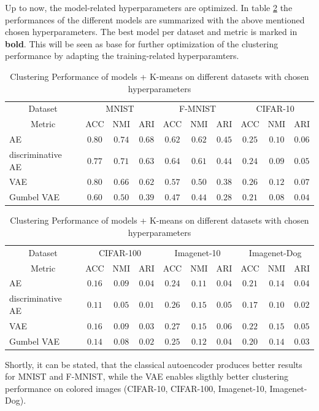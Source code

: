 \documentclass[12pt,DIV14,BCOR12mm,a4paper,footexclude,headinclude,halfparskip-,twoside,openright,cleardoubleempty,idxtotoc,bibtotoc,listtotoc,abstracton]{scrreprt} %
\numberwithin{equation}{chapter}
\begin{document}
Up to now, the model-related hyperparameters are optimized. In table \ref{tab:ClusterPerformance_Models_ModelrelatedParams} the performances of the different models are summarized with the above mentioned chosen hyperparameters. The best model per dataset and metric is marked in \textbf{bold}. This will be seen as base for further optimization of the clustering performance by adapting the training-related hyperparamters.
	\begin{table}[htb!]
    		\centering
    		\caption{Clustering Performance of models + K-means on different datasets with chosen hyperparameters}
    		\label{tab:ClusterPerformance_Models_ModelrelatedParams}
    		\begin{tabular}{l|ccccccccc}
    			\toprule
    			\multicolumn{1}{c}{Dataset} & \multicolumn{3}{c}{MNIST} & \multicolumn{3}{c}{F-MNIST} & \multicolumn{3}{c}{CIFAR-10}\\
        		\multicolumn{1}{c}{Metric} & ACC & NMI & ARI & ACC & NMI & ARI & ACC & NMI & ARI\\
        		\midrule
    			AE & $\mathbf{0.80}$ & $\mathbf{0.74}$ & $\mathbf{0.68}$ & $0.62$ & $\mathbf{0.62}$ & $\mathbf{0.45}$ & $0.25$ & $0.10$ & $0.06$\\
        		discriminative AE & $0.77$ & $0.71$ & $0.63$ & $\mathbf{0.64}$ & $0.61$ & $0.44$ & $0.24$ & $0.09$ & $0.05$\\
        		VAE & $\mathbf{0.80}$ & $0.66$ & $0.62$ & $0.57$ & $0.50$ & $0.38$ & $\mathbf{0.26}$ & $\mathbf{0.12}$ & $\mathbf{0.07}$\\
        		Gumbel VAE & $0.60$ & $0.50$ & $0.39$ & $0.47$ & $0.44$ & $0.28$ & $0.21$ & $0.08$ & $0.04$\\
        		\bottomrule
    		\end{tabular}    		
    		\begin{tabular}{l|ccccccccc}
    			\toprule
    			\multicolumn{1}{c}{Dataset} & \multicolumn{3}{c}{CIFAR-100} & \multicolumn{3}{c}{Imagenet-10} & \multicolumn{3}{c}{Imagenet-Dog}\\
        		\multicolumn{1}{c}{Metric} & ACC & NMI & ARI & ACC & NMI & ARI & ACC & NMI & ARI\\
        		\midrule
    			AE & $\mathbf{0.16}$ & $\mathbf{0.09}$ & $\mathbf{0.04}$ & $0.24$ & $0.11$ & $0.04$ & $0.21$ & $0.14$ & $0.04$\\
        		discriminative AE & $0.11$ & $0.05$ & $0.01$ & $0.26$ & $\mathbf{0.15}$ & $0.05$ & $0.17$ & $0.10$ & $0.02$\\
        		VAE & $\mathbf{0.16}$ & $\mathbf{0.09}$ & $0.03$ & $\mathbf{0.27}$ & $\mathbf{0.15}$ & $\mathbf{0.06}$ & $\mathbf{0.22}$ & $\mathbf{0.15}$ & $\mathbf{0.05}$\\
        		Gumbel VAE & $0.14$ & $0.08$ & $0.02$ & $0.25$ & $0.12$ & $0.04$ & $0.20$ & $0.14$ & $0.03$\\
        		\bottomrule
    		\end{tabular}
	\end{table}
	Shortly, it can be stated, that the classical autoencoder produces better results for MNIST and F-MNIST, while the VAE enables sligthly better clustering performance on colored images (CIFAR-10, CIFAR-100, Imagenet-10, Imagenet-Dog).
\end{document}

